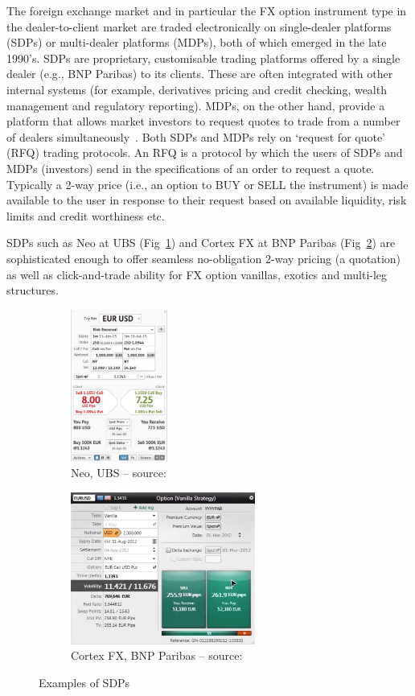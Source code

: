The foreign exchange market and in particular the FX option instrument type in the dealer-to-client market are traded electronically on single-dealer platforms (SDPs) or multi-dealer platforms (MDPs), both of which emerged in the late 1990's. SDPs are proprietary, customisable trading platforms offered by a single dealer (e.g., BNP Paribas) to its clients. These are often integrated with other internal systems (for example, derivatives pricing and credit checking, wealth management and regulatory reporting). MDPs, on the other hand, provide a platform that allows market investors to request quotes to trade from a number of dealers simultaneously~\autocite{BIS2016}. Both SDPs and MDPs rely on `request for quote' (RFQ) trading protocols. An RFQ is a protocol by which the users of SDPs and MDPs (investors) send in the specifications of an order to request a quote. Typically a 2-way price (i.e., an option to BUY or SELL the instrument) is made available to the user in response to their request based on available liquidity, risk limits and credit worthiness etc.

SDPs such as Neo at UBS (Fig~\ref{Ch1Fig:3a}) and Cortex FX at BNP Paribas (Fig~\ref{Ch1Fig:3b}) are sophisticated enough to offer seamless no-obligation 2-way pricing (a quotation) as well as click-and-trade ability for FX option vanillas, exotics and multi-leg structures.

\begin{figure}[!ht]\centering
    \begin{subfigure}[b]{0.475\linewidth}\centering
        \includegraphics[height=5cm]{./figures/Ch1fig3a.png}
        \caption{Neo, UBS -- source:~\autocite{UBSNEO}}\label{Ch1Fig:3a}
    \end{subfigure}%
    \hfill%
    \begin{subfigure}[b]{0.475\linewidth}\centering
        \includegraphics[height=5cm]{./figures/Ch1fig3b.png}
        \caption{Cortex FX, BNP Paribas -- source:~\autocite{CortexBNP}}\label{Ch1Fig:3b}
    \end{subfigure}
    \caption{Examples of SDPs}\label{Ch1Fig:3}
\end{figure}


